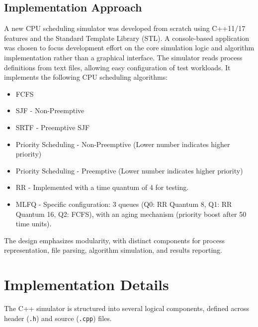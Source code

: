 \documentclass[12pt]{article}
\begin{document}
\subsection{Implementation Approach}
A new CPU scheduling simulator was developed from scratch using C++11/17 features and the Standard Template Library (STL). A console-based application was chosen to focus development effort on the core simulation logic and algorithm implementation rather than a graphical interface. The simulator reads process definitions from text files, allowing easy configuration of test workloads. It implements the following CPU scheduling algorithms:
\begin{itemize}
    \item FCFS
    \item SJF - Non-Preemptive
    \item SRTF - Preemptive SJF
    \item Priority Scheduling - Non-Preemptive (Lower number indicates higher priority)
    \item Priority Scheduling - Preemptive (Lower number indicates higher priority)
    \item RR - Implemented with a time quantum of 4 for testing.
    \item MLFQ - Specific configuration: 3 queues (Q0: RR Quantum 8, Q1: RR Quantum 16, Q2: FCFS), with an aging mechanism (priority boost after 50 time units).
\end{itemize}
The design emphasizes modularity, with distinct components for process representation, file parsing, algorithm simulation, and results reporting.

\section{Implementation Details}
The C++ simulator is structured into several logical components, defined across header (\texttt{.h}) and source (\texttt{.cpp}) files.
\end{document}
